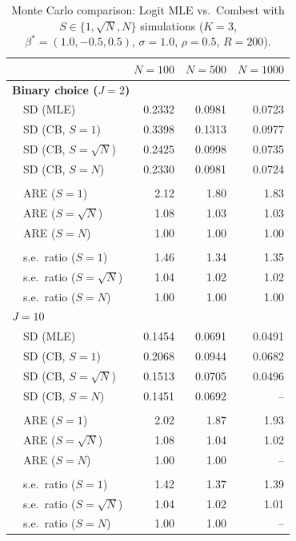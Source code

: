\begin{table}[t]
\centering
\caption{Monte Carlo comparison: Logit MLE vs.\ Combest with $S \in \{1, \sqrt{N}, N\}$ simulations
($K=3$, $\beta^*=(1.0,-0.5,0.5)$, $\sigma=1.0$, $\rho=0.5$, $R=200$).}
\label{tab:unit_demand_logit_efficiency}
\small
\begin{tabular}{llrrr}
\toprule
 & & $N=100$ & $N=500$ & $N=1000$ \\
\midrule
\multicolumn{5}{l}{\textbf{Binary choice ($J=2$)}} \\[2pt]
  & SD (MLE) & 0.2332 & 0.0981 & 0.0723 \\
  & SD (CB, $S{=}1$) & 0.3398 & 0.1313 & 0.0977 \\
  & SD (CB, $S{=}\sqrt{N}$) & 0.2425 & 0.0998 & 0.0735 \\
  & SD (CB, $S{=}N$) & 0.2330 & 0.0981 & 0.0724 \\
  \\[-4pt]
  & ARE ($S{=}1$) & 2.12 & 1.80 & 1.83 \\
  & ARE ($S{=}\sqrt{N}$) & 1.08 & 1.03 & 1.03 \\
  & ARE ($S{=}N$) & 1.00 & 1.00 & 1.00 \\
  \\[-4pt]
  & s.e.\ ratio ($S{=}1$) & 1.46 & 1.34 & 1.35 \\
  & s.e.\ ratio ($S{=}\sqrt{N}$) & 1.04 & 1.02 & 1.02 \\
  & s.e.\ ratio ($S{=}N$) & 1.00 & 1.00 & 1.00 \\
\midrule
\multicolumn{5}{l}{\textbf{$J=10$}} \\[2pt]
  & SD (MLE) & 0.1454 & 0.0691 & 0.0491 \\
  & SD (CB, $S{=}1$) & 0.2068 & 0.0944 & 0.0682 \\
  & SD (CB, $S{=}\sqrt{N}$) & 0.1513 & 0.0705 & 0.0496 \\
  & SD (CB, $S{=}N$) & 0.1451 & 0.0692 & -- \\
  \\[-4pt]
  & ARE ($S{=}1$) & 2.02 & 1.87 & 1.93 \\
  & ARE ($S{=}\sqrt{N}$) & 1.08 & 1.04 & 1.02 \\
  & ARE ($S{=}N$) & 1.00 & 1.00 & -- \\
  \\[-4pt]
  & s.e.\ ratio ($S{=}1$) & 1.42 & 1.37 & 1.39 \\
  & s.e.\ ratio ($S{=}\sqrt{N}$) & 1.04 & 1.02 & 1.01 \\
  & s.e.\ ratio ($S{=}N$) & 1.00 & 1.00 & -- \\
\bottomrule
\end{tabular}
\end{table}